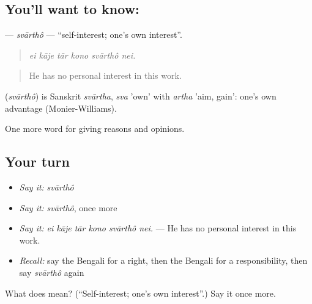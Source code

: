 \subsection*{You'll want to know: }
\textbf{} — \emph{svārthô} — \textquotedblleft{}self-interest; one's own interest\textquotedblright{}.

\begin{quote}
     
\end{quote}

\begin{quote}
\emph{ei kāje tār kono svārthô nei.}
\end{quote}

\begin{quote}
He has no personal interest in this work.
\end{quote}

\begin{cousinweb}
\textbf{} (\emph{svārthô}) is Sanskrit \emph{svārtha}, \emph{sva} 'own' with \emph{artha} 'aim, gain': one's own advantage (Monier-Williams).
\end{cousinweb}

\begin{grammarlens}[title={What you've built}]
One more word for giving reasons and opinions.
\end{grammarlens}

\subsection*{Your turn}
\begin{itemize}
\raggedright
  \item \emph{Say it:} \emph{svārthô}
  \item \emph{Say it:} \emph{svārthô}, once more
  \item \emph{Say it:} \emph{ei kāje tār kono svārthô nei.} — He has no personal interest in this work.
  \item \emph{Recall:} say the Bengali for a right, then the Bengali for a responsibility, then say \emph{svārthô} again
\end{itemize}

\begin{tcolorbox}[breakable,colback=teal!4,colframe=teal!35!black,title={Before you move on}]
What does  mean? (\textquotedblleft{}Self-interest; one's own interest\textquotedblright{}.) Say it once more.
\end{tcolorbox}
